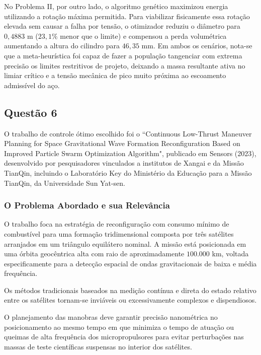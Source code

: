 \documentclass[a4paper, 12pt]{article}%
\begin{document}
No Problema II, por outro lado, o algoritmo genético maximizou energia utilizando a rotação máxima permitida. Para viabilizar fisicamente essa rotação elevada sem causar a falha por tensão, o otimizador reduziu o diâmetro para $0,4883\text{ m}$ ($23,1\%$ menor que o limite) e compensou a perda volumétrica aumentando a altura do cilindro para $46,35\text{ mm}$. Em ambos os cenários, nota-se que a meta-heurística foi capaz de fazer a população tangenciar com extrema precisão os limites restritivos de projeto, deixando a massa resultante ativa no limiar crítico e a tensão mecânica de pico muito próxima ao escoamento admissível do aço.

\newpage

\subsection*{Questão 6}

O trabalho de controle ótimo escolhido foi o ``Continuous Low-Thrust Maneuver Planning for Space Gravitational Wave Formation Reconfiguration Based on Improved Particle Swarm Optimization Algorithm", publicado em Sensors (2023), desenvolvido por pesquisadores vinculados a institutos de Xangai e da Missão TianQin, incluindo o Laboratório Key do Ministério da Educação para a Missão TianQin, da Universidade Sun Yat-sen.

\subsubsection*{O Problema Abordado e sua Relevância}

O trabalho foca na estratégia de reconfiguração com consumo mínimo de combustível para uma formação tridimensional composta por três satélites arranjados em um triângulo equilátero nominal. A missão está posicionada em uma órbita geocêntrica alta com raio de aproximadamente $100.000$ km, voltada especificamente para a detecção espacial de ondas gravitacionais de baixa e média frequência.

Os métodos tradicionais baseados na medição contínua e direta do estado relativo entre os satélites tornam-se inviáveis ou excessivamente complexos e dispendiosos.

O planejamento das manobras deve garantir precisão nanométrica no posicionamento ao mesmo tempo em que minimiza o tempo de atuação ou queimas de alta frequência dos micropropulsores para evitar perturbações nas massas de teste científicas suspensas no interior dos satélites.
\end{document}
